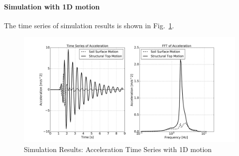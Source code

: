 \paragraph{Simulation with 1D motion }
The time series of simulation results is shown in Fig.~\ref{fig_decon_3D_motion_1D_model_results_top_bottom_time_series_ssi3d_1D_motion}.
\begin{figure}[H]
  \centering
  \includegraphics[width = 15cm]{./Figure-files/nonlinear_analysis_steps/soil-structure-1D-ans/shell_structure_motion_node_38_x_acce_compare.pdf}
  \caption{Simulation Results: Acceleration Time Series with 1D motion}
  \label{fig_decon_3D_motion_1D_model_results_top_bottom_time_series_ssi3d_1D_motion}
\end{figure}

